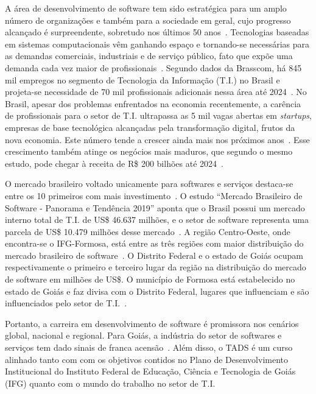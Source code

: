 \documentclass[
	10pt,				%
	openright,			%
	twoside,			%
	a4paper,			%
	english,			%
	french,				%
	brazil,				%
	sumario=tradicional
]{abntex2}
\begin{document}
A área de desenvolvimento de software tem sido estratégica para um amplo número de organizações e também para a sociedade em geral, cujo progresso alcançado é surpreendente, sobretudo nos últimos 50 anos~\cite{sommerville2019engenharia}. 
Tecnologias baseadas em sistemas computacionais vêm ganhando espaço e tornando-se necessárias para as demandas comerciais, industriais e de serviço público, fato que expõe uma demanda cada vez maior de profissionais~\cite{Istoe2019}.
Segundo dados da Brasscom, há 845 mil empregos no segmento de Tecnologia da Informação (T.I.) no Brasil e projeta-se necessidade de 70 mil profissionais adicionais nessa área até 2024~\cite{Convergencia2019}. 
No Brasil, apesar dos problemas enfrentados na economia recentemente, a carência de profissionais para o setor de T.I. ultrapassa as 5 mil vagas abertas em \textit{startups}, empresas de base tecnológica alcançadas pela transformação digital, frutos da nova economia. Este número tende a crescer ainda mais nos próximos anos~\cite{Brasscom2019}. 
Esse crescimento também atinge os negócios mais maduros, que segundo o mesmo estudo, pode chegar à receita de R\$ 200 bilhões até 2024~\cite{Brasscom2019}.

O mercado brasileiro voltado unicamente para softwares e serviços destaca-se entre os 10 primeiros com mais investimento~\cite{Abes2018}. 
O estudo ``Mercado Brasileiro de Software - Panorama e Tendência 2019'' aponta que o Brasil possui um mercado interno total de T.I. de US\$ 46.637 milhões, e o setor de software representa uma parcela de US\$ 10.479 milhões desse mercado~\cite{Abes2018}. 
A região Centro-Oeste, onde encontra-se o IFG-Formosa, está entre as três regiões com maior distribuição do mercado brasileiro de software~\cite{Abes2018}. 
O Distrito Federal e o estado de Goiás ocupam respectivamente o primeiro e terceiro lugar da região na distribuição do mercado de software em milhões de US\$.
O município de Formosa está estabelecido no estado de Goiás e faz divisa com o Distrito Federal, lugares que influenciam e são influenciados pelo setor de T.I.~\cite{Abes2018}.

Portanto, a carreira em desenvolvimento de software é promissora nos cenários global, nacional e regional. 
Para Goiás, a indústria do setor de softwares e serviços tem dado sinais de franca acensão~\cite{Empreendeder2017}. 
Além disso, o TADS é um curso alinhado tanto com com os objetivos contidos no Plano de Desenvolvimento Institucional do Instituto Federal de Educação, Ciência e Tecnologia de Goiás (IFG) quanto com o mundo do trabalho no setor de T.I.
\end{document}
